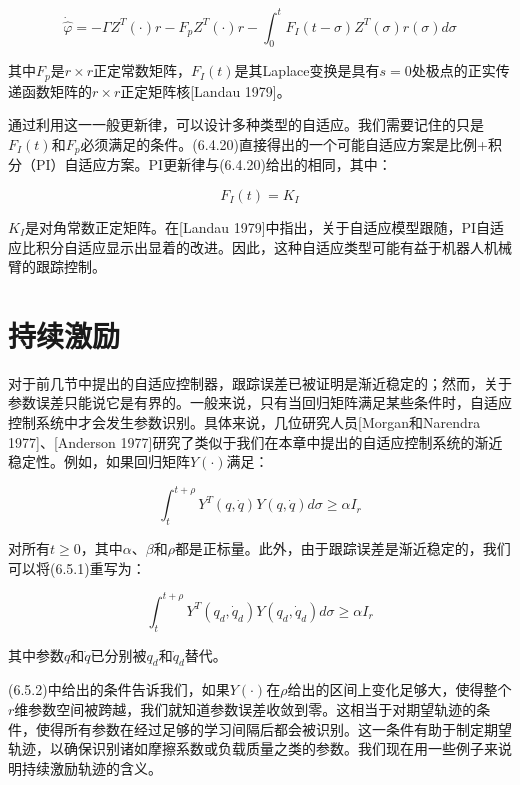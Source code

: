 \documentclass[12pt,a4paper]{ctexart}
\begin{document}
\begin{equation}\label{eq:general-update}
\dot{\hat{\varphi}} = -\Gamma Z^T(\cdot)r - F_p Z^T(\cdot)r - \int_0^t F_I(t-\sigma)Z^T(\sigma)r(\sigma)d\sigma
\end{equation}

其中$F_p$是$r \times r$正定常数矩阵，$F_I(t)$是其Laplace变换是具有$s=0$处极点的正实传递函数矩阵的$r \times r$正定矩阵核[Landau 1979]。

通过利用这一一般更新律，可以设计多种类型的自适应。我们需要记住的只是$F_I(t)$和$F_p$必须满足的条件。(6.4.20)直接得出的一个可能自适应方案是比例+积分（PI）自适应方案。PI更新律与(6.4.20)给出的相同，其中：

\begin{equation}\label{eq:PI-update}
F_I(t) = K_I
\end{equation}

$K_I$是对角常数正定矩阵。在[Landau 1979]中指出，关于自适应模型跟随，PI自适应比积分自适应显示出显着的改进。因此，这种自适应类型可能有益于机器人机械臂的跟踪控制。

\section{持续激励}\label{sec:persistency}

对于前几节中提出的自适应控制器，跟踪误差已被证明是渐近稳定的；然而，关于参数误差只能说它是有界的。一般来说，只有当回归矩阵满足某些条件时，自适应控制系统中才会发生参数识别。具体来说，几位研究人员[Morgan和Narendra 1977]、[Anderson 1977]研究了类似于我们在本章中提出的自适应控制系统的渐近稳定性。例如，如果回归矩阵$Y(\cdot)$满足：

\begin{equation}\label{eq:persistency}
\int_t^{t+\rho} Y^T(q, \dot{q})Y(q, \dot{q})d\sigma \geq \alpha I_r
\end{equation}

对所有$t \geq 0$，其中$\alpha$、$\beta$和$\rho$都是正标量。此外，由于跟踪误差是渐近稳定的，我们可以将(6.5.1)重写为：

\begin{equation}\label{eq:persistency2}
\int_t^{t+\rho} Y^T(q_d, \dot{q}_d)Y(q_d, \dot{q}_d)d\sigma \geq \alpha I_r
\end{equation}

其中参数$q$和$\dot{q}$已分别被$q_d$和$\dot{q}_d$替代。

(6.5.2)中给出的条件告诉我们，如果$Y(\cdot)$在$\rho$给出的区间上变化足够大，使得整个$r$维参数空间被跨越，我们就知道参数误差收敛到零。这相当于对期望轨迹的条件，使得所有参数在经过足够的学习间隔后都会被识别。这一条件有助于制定期望轨迹，以确保识别诸如摩擦系数或负载质量之类的参数。我们现在用一些例子来说明持续激励轨迹的含义。
\end{document}
